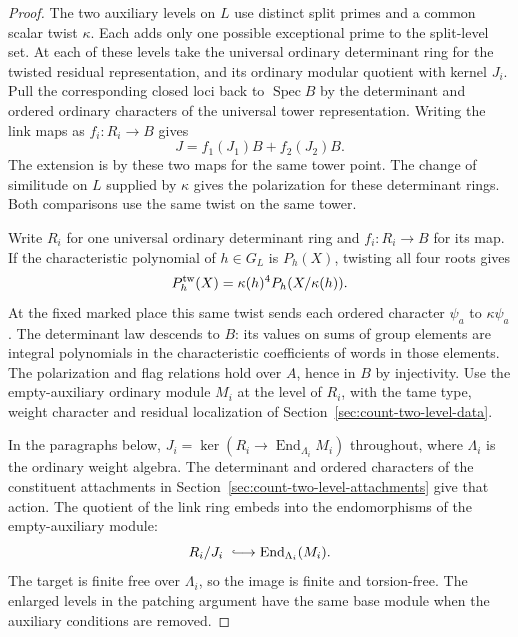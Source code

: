 \begin{proof}

The two auxiliary levels on \(L\) use distinct split primes
and a common scalar twist \(\kappa\). Each adds only one
possible exceptional prime to the split-level set. At each
of these levels take the universal ordinary determinant ring
for the twisted residual representation, and its ordinary
modular quotient with kernel \(J_i\). Pull the corresponding
closed loci back to \(\operatorname{Spec} B\) by the
determinant and ordered ordinary characters of the universal
tower representation. Writing the link maps as \(f_i:R_i\to B\) gives
\[
                   J=f_1(J_1)B+f_2(J_2)B .
\]
The extension is by these two maps for the same tower point. The change of
similitude on \(L\) supplied by \(\kappa\) gives the
polarization for these determinant rings. Both comparisons
use the same twist on the same tower.

Write \(R_i\) for one universal ordinary determinant ring
and \(f_i:R_i\to B\) for its map. If the characteristic polynomial of \(h\in G_L\) is \(P_h(X)\), twisting all four roots gives
\[
 P_h^{\rm tw}(X)=\kappa(h)^4 P_h(X/\kappa(h)).
\]
At the fixed marked place this same twist sends each ordered character \(\psi_a\) to \(\kappa\psi_a\). The determinant law descends to \(B\): its values on
sums of group elements are integral polynomials in the
characteristic coefficients of words in those elements.
The polarization and flag relations hold over \(A\), hence
in \(B\) by injectivity. Use the empty-auxiliary ordinary
module \(M_i\) at the level of \(R_i\), with the tame type,
weight character and residual localization of
Section~\ref{sec:count-two-level-data}.

In the paragraphs
below, \(J_i=\ker(R_i\to\operatorname{End}_{\Lambda_i}M_i)\)
throughout, where \(\Lambda_i\) is the ordinary weight
algebra. The determinant and ordered characters of the
constituent attachments in
Section~\ref{sec:count-two-level-attachments} give that action.
The quotient of the link ring embeds into the endomorphisms
of the empty-auxiliary module:
\[
    R_i/J_i\ \lhook\joinrel\longrightarrow
                         \operatorname{End}_{\Lambda_i}(M_i).
\]
The target is finite free over \(\Lambda_i\), so the image is
finite and torsion-free.
The enlarged levels in the patching argument have the
same base module when the auxiliary conditions are removed.


\end{proof}
